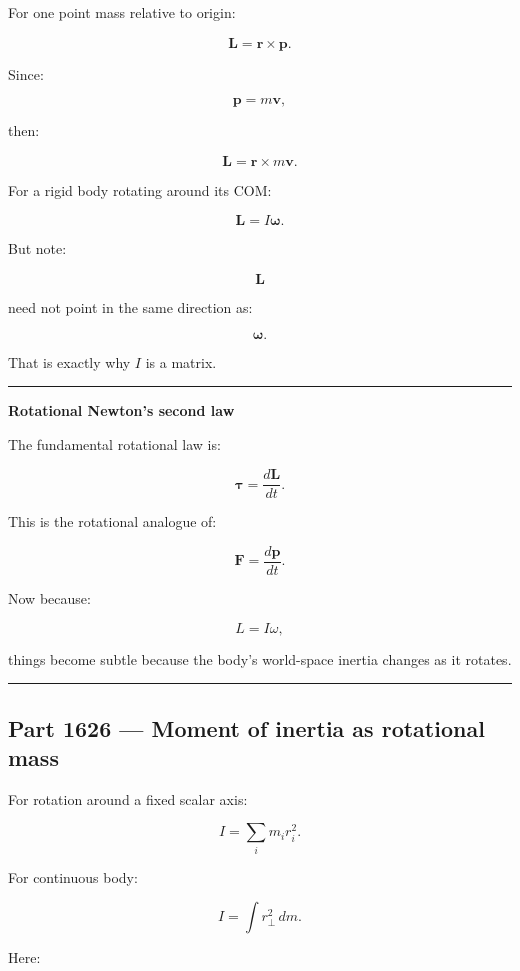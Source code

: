 For one point mass relative to origin:

\[
\boxed{
\mathbf{L}
=
\mathbf{r}\times\mathbf{p}.
}
\]

Since:

\[
\mathbf{p}=m\mathbf{v},
\]

then:

\[
\mathbf{L}
=
\mathbf{r}\times
m\mathbf{v}.
\]

For a rigid body rotating around its COM:

\[
\boxed{
\mathbf{L}
=
I\boldsymbol{\omega}.
}
\]

But note:

\[
\mathbf{L}
\]

need not point in the same direction as:

\[
\boldsymbol{\omega}.
\]

That is exactly why \(I\) is a matrix.

\begin{center}\rule{0.5\linewidth}{0.5pt}\end{center}

\textbf{Rotational Newton's second law}

The fundamental rotational law is:

\[
\boxed{
\boldsymbol{\tau}
=
\frac{d\mathbf{L}}{dt}.
}
\]

This is the rotational analogue of:

\[
\mathbf{F}
=
\frac{d\mathbf{p}}{dt}.
\]

Now because:

\[
L=I\omega,
\]

things become subtle because the body's world-space inertia changes as it rotates.

\begin{center}\rule{0.5\linewidth}{0.5pt}\end{center}

\subsection{Part 1626 --- Moment of inertia as rotational mass}\label{06-engine-ii-ch035-part-1626-moment-of-inertia-as-rotational-mass}

For rotation around a fixed scalar axis:

\[
\boxed{
I
=
\sum_i
m_ir_i^2.
}
\]

For continuous body:

\[
\boxed{
I
=
\int
r_\perp^2\,dm.
}
\]

Here:

